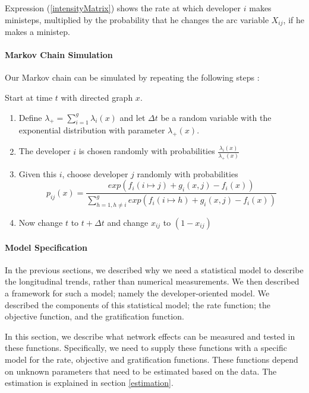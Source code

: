 \documentclass[12pt]{report}
\begin{document}
Expression (\ref{intensityMatrix}) shows the rate at which developer $i$ makes ministeps, multiplied by the probability that he changes the arc variable $X_{ij}$, if he makes a ministep.\\

\paragraph*{Markov Chain Simulation}
\label{MarkovChainSimulationSteps}
Our Markov chain can be simulated by repeating the following steps \cite{Snijders2004}:

Start at time $t$ with directed graph $x$. 
\begin{enumerate}
\item Define $\lambda_{+} = \sum_{i=1}^g \lambda_i(x)$ and let $\Delta t$ be a random variable with the exponential distribution with parameter $\lambda_{+}(x)$.
\item The developer $i$ is chosen randomly with probabilities $\frac{\lambda_{i}(x)}{\lambda_{+}(x)}$
\item Given this $i$, choose developer $j$ randomly with probabilities 
\begin{equation}
p_{ij}(x) = \frac{exp(f_i(i \mapsto j) + g_i(x, j) - f_i(x))}{\sum_{h=1, h \neq i}^{g} exp(f_i(i \mapsto h) + g_i(x, j) - f_i(x))} \nonumber
\end{equation}
\item Now change $t$ to $t + \Delta t$ and change $x_{ij}$ to $(1 - x_{ij})$
\end{enumerate}

\paragraph*{Model Specification}
In the previous sections, we described why we need a statistical model to describe the longitudinal trends, rather than numerical measurements. We then described a framework for such a model; namely the developer-oriented model. We described the components of this statistical model; the rate function; the objective function, and the gratification function.

In this section, we describe what network effects can be measured and tested in these functions. Specifically, we need to supply these functions with a specific model for the rate, objective and gratification functions. These functions depend on unknown parameters that need to be estimated based on the data. The estimation is explained in section \ref{estimation}. 
\end{document}
